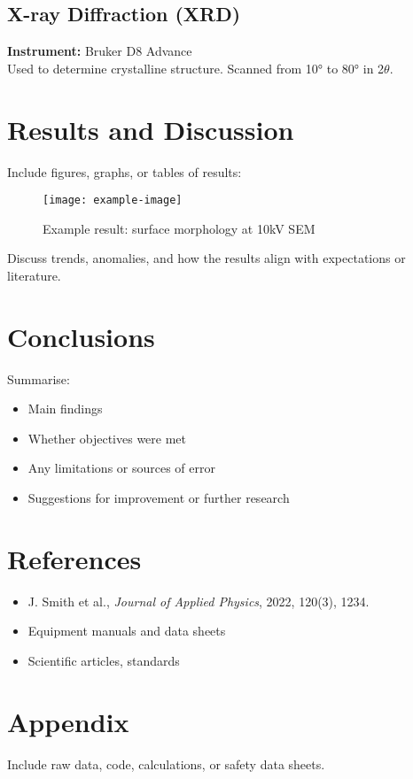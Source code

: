 \documentclass[12pt,a4paper]{article}
\begin{document}
\subsection*{X-ray Diffraction (XRD)}
\textbf{Instrument:} Bruker D8 Advance \\
Used to determine crystalline structure. Scanned from 10° to 80° in 2$\theta$.

\section{Results and Discussion}
Include figures, graphs, or tables of results:
\begin{figure}[H]
    \centering
    \texttt{[image: example-image]}
    \caption{Example result: surface morphology at 10kV SEM}
\end{figure}

Discuss trends, anomalies, and how the results align with expectations or literature.

\section{Conclusions}
Summarise:
\begin{itemize}
    \item Main findings
    \item Whether objectives were met
    \item Any limitations or sources of error
    \item Suggestions for improvement or further research
\end{itemize}

\section*{References}
\begin{itemize}
    \item J. Smith et al., \textit{Journal of Applied Physics}, 2022, 120(3), 1234.
    \item Equipment manuals and data sheets
    \item Scientific articles, standards
\end{itemize}

\appendix
\section*{Appendix}
Include raw data, code, calculations, or safety data sheets.
\end{document}
